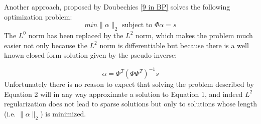 \documentclass[12pt,a4paper]{article}
\begin{document}
Another approach, proposed by Doubechies \ref{9 in BP} solves the following optimization problem: 
\begin{equation}
min \| \alpha \| _2 \mbox{ subject to } \Phi \alpha = s
\end{equation} 
The $L^0$ norm has been replaced by the $L^2$ norm, which makes the problem much easier not only because the $L^2$ norm is differentiable but because there is a well known closed form solution given by the pseudo-inverse: 

\begin{equation} 
\nonumber 
\alpha = \Phi^T(\Phi \Phi^T)^{-1}s
\end{equation}
Unfortunately there is no reason to expect that solving the problem described by Equation 2 will in any way approximate a solution to Equation 1, and indeed $L^2$ regularization does not lead to sparse solutions but only to solutions whose length (i.e. $\| \alpha \|_2$) is minimized.  
\end{document}
